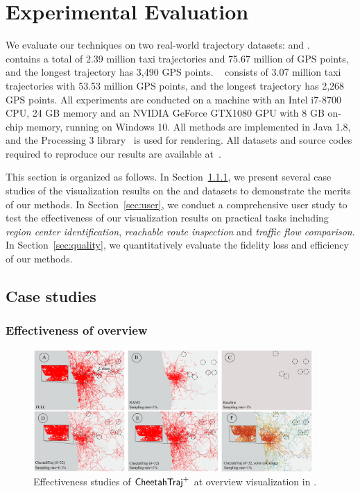 \section{Experimental Evaluation}\label{sec:exp}
We evaluate our techniques on two real-world trajectory datasets: \pt{} and \sz{}.
\pt{}~\cite{pt} contains a total of 2.39 million taxi trajectories and 75.67 million of GPS points, and the longest trajectory has 3,490 GPS points.
\sz{}~\cite{sz} consists of 3.07 million taxi trajectories with 53.53 million GPS points, and the longest trajectory has 2,268 GPS points. All experiments are conducted on a machine with an Intel i7-8700 CPU, 24 GB memory and an NVIDIA GeForce GTX1080 GPU with 8 GB on-chip memory, running on Windows 10. All methods are implemented in Java 1.8, and the Processing 3 library~\cite{p3} is used for rendering. All datasets and source codes required to reproduce our results are available at~\cite{code}.

This section is organized as follows.
In Section~\ref{sec:case}, we present several case studies of the visualization results on the \pt{} and \sz{} datasets to demonstrate the merits of our methods.
In Section~\ref{sec:user}, we conduct a comprehensive user study to test the effectiveness of our visualization results on practical  tasks including \textit{region center identification}, \textit{reachable route inspection} and \textit{traffic flow comparison}. In Section~\ref{sec:quality}, we quantitatively evaluate the fidelity loss and efficiency of our methods.

\trim \trim

\subsection{Case studies}
\subsubsection{Effectiveness of overview}\label{sec:case}

\begin{figure}[t]
	\centering
	\includegraphics[width=0.95\textwidth]{pictures/experiment_study/case_study_overview.pdf}
	\vspace{-3mm}
	\caption{Effectiveness studies of $\mathsf{CheetahTraj}^{+}$ at overview visualization in \pt{}.}
	\label{fig:overview}
	\vspace{-2mm}
\end{figure}


